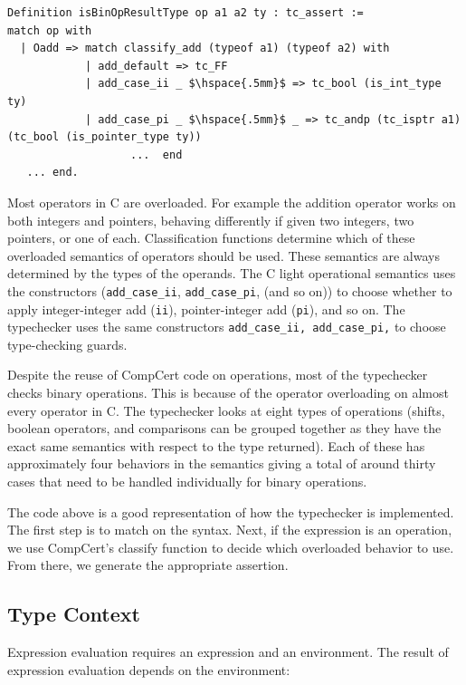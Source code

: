 \documentclass{puthesis}
\begin{document}
\begin{lstlisting}
Definition isBinOpResultType op a1 a2 ty : tc_assert :=
match op with
  | Oadd => match classify_add (typeof a1) (typeof a2) with 
            | add_default => tc_FF
            | add_case_ii _ $\hspace{.5mm}$ => tc_bool (is_int_type ty) 
            | add_case_pi _ $\hspace{.5mm}$ _ => tc_andp (tc_isptr a1) (tc_bool (is_pointer_type ty)) 
                   ...  end   
   ... end.
\end{lstlisting}

Most operators in C are overloaded. For example the addition operator
works on both integers and pointers, behaving differently if given two
integers, two pointers, or one of each.  Classification functions
determine which of these overloaded semantics of operators should be
used. These semantics are always determined by the types of the
operands.  The C light operational semantics uses the constructors
(\lstinline|add_case_ii|, \lstinline|add_case_pi|, (and so on)) to
choose whether to apply integer-integer add (\lstinline|ii|),
pointer-integer add (\lstinline|pi|), and so on.  The typechecker uses
the same constructors \lstinline{add_case_ii, add_case_pi,} to choose
type-checking guards.

Despite the reuse of CompCert code on operations, most of the
typechecker checks binary operations. This is because of the operator
overloading on almost every operator in C. The typechecker looks at
eight types of operations (shifts, boolean operators, and comparisons
can be grouped together as they have the exact same semantics with
respect to the type returned). Each of these has approximately four
behaviors in the semantics giving a total of around thirty cases that
need to be handled individually for binary operations.
 
The code above is a good representation of how the typechecker is
implemented. The first step is to match on the syntax. Next, if the expression
is an operation, we use CompCert's classify function to decide which overloaded
behavior to use. From there, we generate the appropriate assertion. 

\subsection{Type Context}
\label{sec:context}

Expression evaluation requires an expression and an environment.  The
result of expression evaluation depends on the environment:
\end{document}
